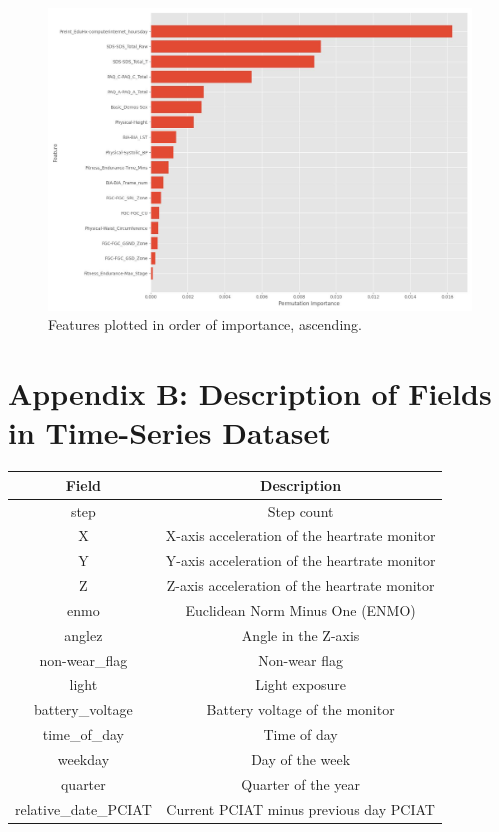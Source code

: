 \documentclass[11pt]{extarticle}
\begin{document}
\begin{figure}[h!]
    \centering
    \includegraphics[scale=0.4]{"./images/feature_importance.jpg"}
    \caption{Features plotted in order of importance, ascending.}
\end{figure}

\section*{Appendix B: Description of Fields in Time-Series Dataset}

\begin{table}[h!]
    \centering
    \begin{tabular}{|c|c|}
    \hline
    \textbf{Field} & \textbf{Description} \\
    \hline
    step & Step count \\
    X & X-axis acceleration of the heartrate monitor \\
    Y & Y-axis acceleration of the heartrate monitor \\
    Z & Z-axis acceleration of the heartrate monitor \\
    enmo & Euclidean Norm Minus One (ENMO) \\
    anglez & Angle in the Z-axis \\
    non-wear\_flag & Non-wear flag \\
    light & Light exposure \\
    battery\_voltage & Battery voltage of the monitor \\
    time\_of\_day & Time of day \\
    weekday & Day of the week \\
    quarter & Quarter of the year \\
    relative\_date\_PCIAT & Current PCIAT minus previous day PCIAT \\
    \hline
    \end{tabular}
    \label{table:fields}
\end{table}
\end{document}

